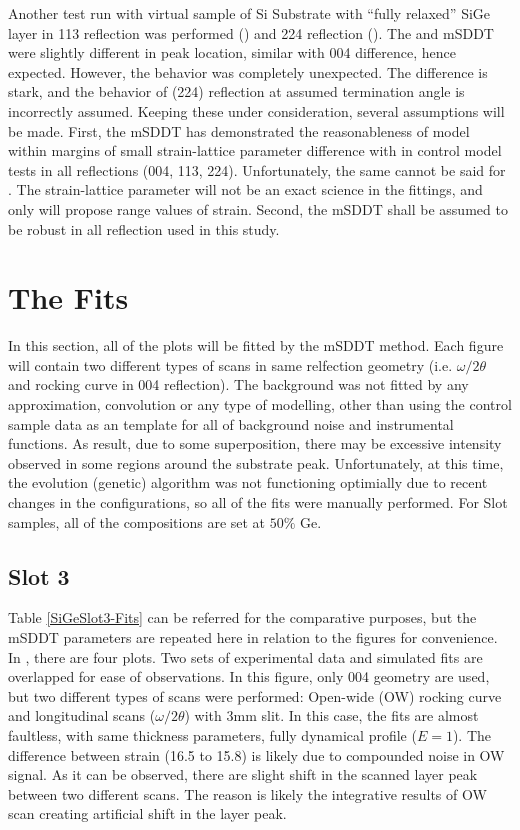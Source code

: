 Another test run with virtual sample of Si Substrate with ``fully relaxed'' SiGe layer in 113 reflection was performed () and 224 reflection ().
The \RADS  and mSDDT were slightly different in peak location, similar with 004 difference, hence expected.  However, the \LEPTOS behavior was completely unexpected.  The difference is stark, and the behavior of (224) reflection at assumed termination angle is incorrectly assumed.  Keeping these under consideration, several assumptions will be made.  First, the mSDDT has demonstrated the reasonableness of model within margins of small strain-lattice parameter difference with \RADS in control model tests in all reflections (004, 113, 224).  Unfortunately, the same cannot be said for \LEPTOS.  The strain-lattice parameter will not be an exact science in the fittings, and only will propose range values of  strain.  Second, the mSDDT shall be assumed to be robust in all reflection used in this study.

\section{The Fits}

In this section, all of the plots will be fitted by the mSDDT method.  Each figure will contain two different types of scans in same relfection geometry (i.e. $\omega/2\theta$ and rocking curve in 004 reflection).  The background was not fitted by any approximation, convolution or any type of modelling, other than using the control sample data as an template for all of background noise and instrumental functions.  As result, due to some superposition, there may be excessive intensity observed in some regions around the substrate peak.  Unfortunately, at this time, the evolution (genetic) algorithm was not functioning optimially due to recent changes in the \MathLogo configurations, so all of the fits were manually performed.  For Slot samples, all of the compositions are set at $50\%$ Ge.

\subsection{Slot 3}  

Table \ref{SiGeSlot3-Fits} can be referred for the comparative purposes, but the mSDDT parameters are repeated here in relation to the figures for convenience.  In , there are four plots.  Two sets of experimental data and simulated fits are overlapped for ease of observations.  In this figure, only 004 geometry are used, but two different types of scans were performed:  Open-wide (OW) rocking curve and longitudinal scans ($\omega/2\theta$) with 3mm slit.  In this case, the fits are almost faultless, with same thickness parameters, fully dynamical profile ($E = 1$).  The difference between strain (16.5 to 15.8)  is likely due to compounded noise in OW signal.  As it can be observed, there are slight shift in the scanned layer peak between two different scans.  The reason is likely the integrative results of OW scan creating artificial shift in the layer peak.

